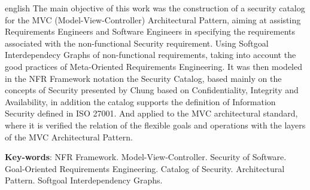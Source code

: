 \begin{resumo}[Abstract]
 \begin{otherlanguage*}{english}
   The main objective of this work was the construction of a security catalog for the MVC (Model-View-Controller) Architectural Pattern, aiming at assisting Requirements Engineers and Software Engineers in specifying the requirements associated with the non-functional Security requirement. Using Softgoal Interdependecy Graphs of non-functional requirements, taking into account the good practices of Meta-Oriented Requirements Engineering. It was then modeled in the NFR Framework notation the Security Catalog, based mainly on the concepts of Security presented by Chung based on Confidentiality, Integrity and Availability, in addition the catalog supports the definition of Information Security defined in ISO 27001. And applied to the MVC architectural standard, where it is verified the relation of the flexible goals and operations with the layers of the MVC Architectural Pattern.

   \vspace{\onelineskip}
 
   \noindent 
   \textbf{Key-words}: NFR Framework. Model-View-Controller. Security of Software. Goal-Oriented Requirements Engineering. Catalog of Security. Architectural Pattern. Softgoal Interdependency Graphs.
 \end{otherlanguage*}
\end{resumo}
